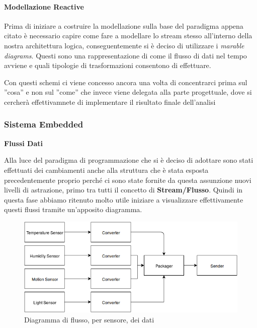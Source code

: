 \paragraph{Modellazione Reactive}

Prima di iniziare a costruire la modellazione sulla base del paradigma appena citato \`e necessario capire come fare a modellare lo stream stesso all'interno della nostra architettura logica, conseguentemente si \`e deciso di utilizzare i \textit{marable diagrams}. Questi sono una rappresentazione di come il flusso di dati nel tempo avviene e quali tipologie di trasformazioni consentono di effettuare.

Con questi schemi ci viene concesso ancora una volta di concentrarci prima sul ''cosa'' e non sul ''come'' che invece viene delegata alla parte progettuale, dove si cercher\`a effettivamnete di implementare il risultato finale dell'analisi

\subsubsection{Sistema Embedded}

\begin{center}
  \textbf{Flussi Dati}
\end{center}

Alla luce del paradigma di programmazione che si \`e deciso di adottare sono stati effettuati dei cambiamenti anche alla struttura che \`e stata esposta precedentemente proprio perch\'e ci sono state fornite da questa assunzione nuovi livelli di astrazione, primo tra tutti il concetto di \textbf{Stream/Flusso}. Quindi in questa fase abbiamo ritenuto molto utile iniziare a visualizzare effettivamente questi flussi tramite un'apposito diagramma.

\begin{figure}[ht]
\centering
\includegraphics[width=\textwidth]{Figures/LogicArchitecture/EmbeddedSystem/FlowDiagram}
\caption{Diagramma di flusso, per sensore, dei dati}
\end{figure}



